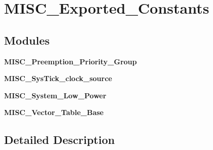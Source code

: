 \section{M\+I\+S\+C\+\_\+\+Exported\+\_\+\+Constants}
\label{group__MISC__Exported__Constants}
\subsection*{Modules}
\begin{DoxyCompactItemize}
\item 
\textbf{ M\+I\+S\+C\+\_\+\+Preemption\+\_\+\+Priority\+\_\+\+Group}
\item 
\textbf{ M\+I\+S\+C\+\_\+\+Sys\+Tick\+\_\+clock\+\_\+source}
\item 
\textbf{ M\+I\+S\+C\+\_\+\+System\+\_\+\+Low\+\_\+\+Power}
\item 
\textbf{ M\+I\+S\+C\+\_\+\+Vector\+\_\+\+Table\+\_\+\+Base}
\end{DoxyCompactItemize}


\subsection{Detailed Description}
